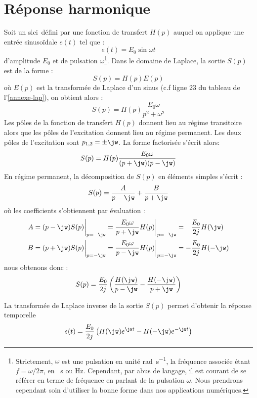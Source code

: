 \section{Réponse harmonique}
Soit un \gls{slci}~défini par une fonction de transfert $H(p)$ auquel on 
applique une entrée sinuso\"idale $e(t)$ tel que :
$$
e(t)=E_0\sin\omega t 
$$
d'amplitude $E_0$ et de pulsation $\omega$\footnote{Strictement, $\omega$ est 
une pulsation en unité \si{\radian\per\second}, la fréquence associée étant 
$f=\omega/2\pi$, en \si{\per\second} ou \si{\hertz}. Cependant, par abus de 
langage, il est courant de se référer en terme de fréquence en parlant de la 
pulsation $\omega$. Nous prendrons cependant soin d'utiliser la bonne forme 
dans nos applications numériques.}. Dans le domaine de Laplace, la sortie $S(p)$
est de la forme :
$$
S(p)=H(p)E(p)
$$
où $E(p)$ est la transformée de Laplace d'un sinus (c.f ligne 23 du tableau de 
l'\cref{annexe-lap}), on obtient alors :
$$
S(p)=H(p)\dfrac{E_0\omega}{p^2+\omega^2}
$$
Les pôles de la fonction de transfert $H(p)$ donnent lieu au 
régime transitoire alors que les pôles de l'excitation donnent 
lieu au régime permanent. 
Les deux pôles de l'excitation sont $p_{1,2}=\pm\jw$. La forme factorisée 
s'écrit alors:
$$
S(p)=H(p)\dfrac{E_0\omega}{(p+\jw)(p-\jw)}
$$
En régime permanent, la décomposition de $S(p)$ en éléments simples s'écrit :
$$
S(p)=\dfrac{A}{p-\jw} + \dfrac{B}{p+\jw}
$$
où les coefficients s'obtiennent par évaluation :
\begin{align*}
    A&=(p-\jw)S(p)\bigg|_{p=\hphantom{-}\jw}=
       \dfrac{E_0\omega}{p+\jw}H(p)\bigg|_{p=\hphantom{-}\jw}=
       \hphantom{-}\dfrac{E_0}{2j}H(\jw)\\
    B&=(p+\jw)S(p)\bigg|_{p=-\jw}=
       \dfrac{E_0\omega}{p-\jw}H(p)\bigg|_{p=-\jw}=
       -\dfrac{E_0}{2j}H(-\jw)
\end{align*}
nous obtenons donc :
$$
S(p)=\dfrac{E_0}{2j}\left(\dfrac{H(\jw)}{p-\jw}-\dfrac{H(-\jw)}{p+\jw} \right)
$$

La transformée de Laplace inverse de la sortie $S(p)$ permet d'obtenir la 
réponse temporelle 
$$
s(t)=\dfrac{E_0}{2j}\left(H(\jw)e^{\jw t}-H(-\jw)e^{-\jw t}\right)
$$

